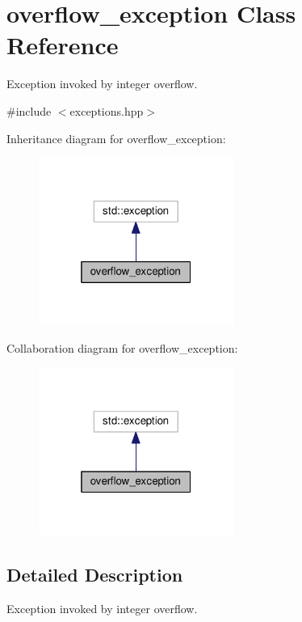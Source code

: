 \hypertarget{classoverflow__exception}{}\section{overflow\+\_\+exception Class Reference}
\label{classoverflow__exception}


Exception invoked by integer overflow.  




{\ttfamily \#include $<$exceptions.\+hpp$>$}



Inheritance diagram for overflow\+\_\+exception\+:\nopagebreak
\begin{figure}[H]
\begin{center}
\leavevmode
\includegraphics[width=181pt]{classoverflow__exception__inherit__graph}
\end{center}
\end{figure}


Collaboration diagram for overflow\+\_\+exception\+:\nopagebreak
\begin{figure}[H]
\begin{center}
\leavevmode
\includegraphics[width=181pt]{classoverflow__exception__coll__graph}
\end{center}
\end{figure}


\subsection{Detailed Description}
Exception invoked by integer overflow. 

